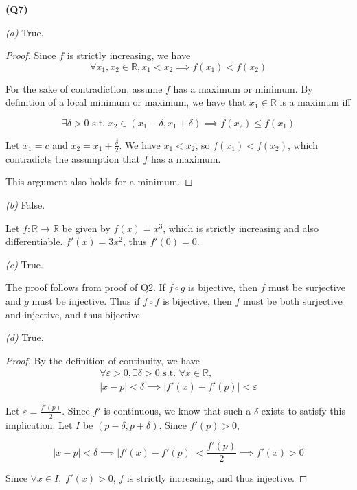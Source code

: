 \documentclass[12pt, a4paper]{article}
\newcommand{\R}{\mathbb{R}}
\newcommand{\st}{\text{ s.t. }}
\newcommand{\fn}[3]{#1 \colon #2 \to #3}
\begin{document}
\textbf{(Q7)}

\textit{(a)} True.

\begin{proof}
    Since $f$ is strictly increasing, we have
    \[
        \forall x_1, x_2 \in \R, x_1 < x_2 \implies f(x_1) < f(x_2)
    \]

    For the sake of contradiction, assume $f$ has a maximum or minimum. By
    definition of a local minimum or maximum, we have that $x_1 \in \R$ is a
    maximum iff

    \[
        \exists \delta > 0 \st x_2 \in (x_1 - \delta, x_1 + \delta) 
        \implies f(x_2) \leq f(x_1)
    \]

    Let $x_1 = c$ and $x_2 = x_1 + \frac{\delta}{2}$. We have $x_1 < x_2$, so
    $f(x_1) < f(x_2)$, which contradicts the assumption that $f$ has a maximum.

    This argument also holds for a minimum.

\end{proof}

\textit{(b)} False.

Let $\fn{f}{\R}{\R}$ be given by $f(x) = x^3$, which is strictly increasing
and also differentiable. $f'(x) = 3x^2$, thus $f'(0) = 0$.

\textit{(c)} True.

The proof follows from proof of Q2. If $f \circ g$ is bijective, then $f$ must
be surjective and $g$ must be injective. Thus if $f \circ f$ is bijective, then
$f$ must be both surjective and injective, and thus bijective.

\textit{(d)} True.

\begin{proof}
    By the definition of continuity, we have
    \begin{gather*}
        \forall \varepsilon > 0, \exists \delta > 0 \st \forall x \in \R,\\
        |x - p| < \delta \implies |f'(x) - f'(p)| < \varepsilon
    \end{gather*}

    Let $\varepsilon = \displaystyle\frac{f'(p)}{2}$.
    Since $f'$ is continuous, we know that such a $\delta$ exists to
    satisfy this implication. Let $I$ be $(p - \delta, p + \delta)$.
    Since $f'(p) > 0$,

    \[
        |x - p| < \delta \implies |f'(x) - f'(p)| < \frac{f'(p)}{2}
        \implies f'(x) > 0
    \]

    Since $\forall x \in I,\; f'(x) > 0$, $f$ is strictly increasing,
    and thus injective.
\end{proof}
\end{document}
